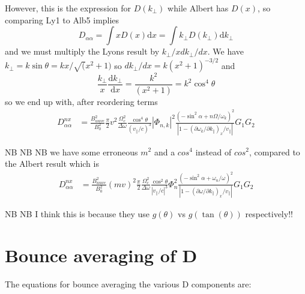 \documentclass[]{article}
\begin{document}
However, this is the expression for $D(k_\perp)$ while Albert has $D(x)$, so comparing Ly1 to Alb5 implies
\begin{equation}
D_{\alpha\alpha} = \int x D(x) \mathrm{d}x = \int k_\perp D(k_\perp) \mathrm{d} k_\perp
\end{equation}
and we must multiply the Lyons result by $k_\perp/x dk_\perp/dx$. 
We have $k_\perp = k \sin \theta = k x /\sqrt(x^2 +1)$ so $dk_\perp/dx = k (x^2+1)^{-3/2}$ and
\[ \frac{k_\perp}{x}\frac{\mathrm{d} k_\perp}{\mathrm{d} x} = \frac{k^2}{(x^2+1)}  = k^2 \cos^4\theta\]
so we end up with, after reordering terms
\begin{align}\label{LyEnd}
D_{\alpha\alpha}^{nx} &= \frac{B^2_{wave}}{B_0^2} \frac{\pi}{2} v^2 \frac{ \Omega_c^2 }{\Delta \omega}\frac{\cos^4\theta}{(v_\parallel/c)^3} |\Phi_{n,k}|^2 \frac{ (-\sin^2\alpha + n \Omega/\omega_k)^2}{ |1-(\partial \omega_k/\partial k_\parallel)_x/v_\parallel|} G_1 G_2
\end{align}

NB NB NB we have some erroneous $m^2$ and a $cos^4$ instead of $cos^2$, compared to the Albert result which is
\begin{align}
D_{\alpha\alpha}^{nx} &= \frac{B_{wave}^2}{B_0^2}(mv)^2 \frac{\pi}{2}\frac{\Omega_c^2}{\Delta\omega}\frac{\cos^2\theta}{|v_\parallel/c|^3}  \Phi_n^2 \frac{(-\sin^2\alpha + \omega_n/\omega)^2}{|1-(\partial \omega/\partial k_\parallel)_x/v_\parallel|} G_1 G_2 \end{align}

NB NB I think this is because they use $g(\theta)$ vs $g(\tan(\theta))$ respectively!!


\section{Bounce averaging of D}
The equations for bounce averaging the various D components are:
\end{document}
